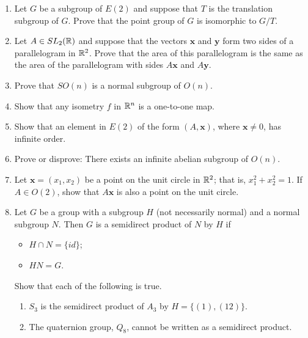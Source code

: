 {\begin{enumerate}
 
\item
Let $G$ be a subgroup of $E(2)$ and suppose that $T$ is the
translation subgroup of $G$.  Prove that the point group of $G$ is
isomorphic to $G/T$. 
 
 
\item
Let $A \in SL_2({\Bbb R})$ and suppose that the vectors ${\mathbf x}$
and ${\mathbf y}$ form two sides of a parallelogram in ${\Bbb R}^2$.
Prove that the area of this parallelogram is the same as the area of
the parallelogram with sides $A{\mathbf x}$ and $A{\mathbf y}$. 
 
 
\item
Prove that $SO(n)$ is a normal subgroup of $O(n)$.
 
 
\item
Show that any isometry $f$ in ${\Bbb R}^n$ is a one-to-one map.
 
 
\item
Show that an element in $E(2)$ of the form $(A, {\mathbf x})$,
where ${\mathbf x} \neq 0$, has infinite order.
 
 
\item
Prove or disprove: There exists an infinite abelian subgroup of 
$O(n)$.
 
 
\item
Let ${\mathbf x} = (x_1, x_2)$ be a point on the unit circle in ${\Bbb
R}^2$; that is, $x_1^2 + x_2^2 = 1$. If $A \in O(2)$, show that $A
{\mathbf x}$ is also a point on the unit circle. 
 
 
 
\item
Let $G$ be a group with a subgroup $H$ (not necessarily normal) and a
normal subgroup $N$. Then $G$ is a {\bfi semidirect
product\/} of $N$ by $H$ if  
\begin{itemize}
 
 \item
$H \cap N = \{ id \}$;
 
 \item
$HN=G$.
 
\end{itemize}
Show that each of the following is true.
\begin{enumerate}
 
 \item
$S_3$ is the semidirect product of $A_3$ by $H = \{(1), (12) \}$.
 
 \item
The quaternion group, $Q_8$, cannot be written as a semidirect product. 
 

\end{enumerate}
\end{enumerate}}
